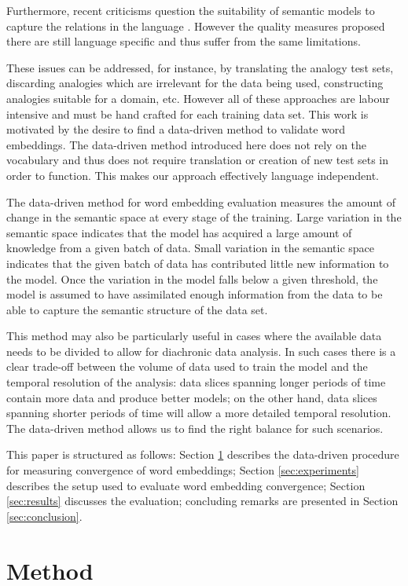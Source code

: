 \documentclass{article} %
\begin{document}
Furthermore, recent criticisms question the suitability of semantic models to capture the relations in the language \cite{Hellrich_COLING2016}. However the quality measures proposed there are still language specific and thus suffer from the same limitations.

These issues can be addressed, for instance, by translating the analogy test sets, discarding analogies which are irrelevant for the data being used, constructing analogies suitable for a domain, etc. However all of these approaches are labour intensive and must be hand crafted for each training data set. This work is motivated by the desire to find a data-driven method to validate word embeddings. The data-driven method introduced here does not rely on the vocabulary and thus does not require translation or creation of new test sets in order to function. This makes our approach effectively language independent.

The data-driven method for word embedding evaluation measures the amount of change in the semantic space at every stage of the training. Large variation in the semantic space indicates that the model has acquired a large amount of knowledge from a given batch of data. Small variation in the semantic space indicates that the given batch of data has contributed little new information to the model. Once the variation in the model falls below a given threshold, the model is assumed to have assimilated enough information from the data to be able to capture the semantic structure of the data set.

This method may also be particularly useful in cases where the available data needs to be divided to allow for diachronic data analysis. In such cases there is a clear trade-off between the volume of data used to train the model and the temporal resolution of the analysis: data slices spanning longer periods of time contain more data and produce better models; on the other hand, data slices spanning shorter periods of time will allow a more detailed temporal resolution. The data-driven method allows us to find the right balance for such scenarios.

This paper is structured as follows: Section \ref{sec:method} describes the data-driven procedure for measuring convergence of word embeddings; Section \ref{sec:experiments} describes the setup used to evaluate word embedding convergence; Section \ref{sec:results} discusses the evaluation; concluding remarks are presented in Section \ref{sec:conclusion}.

\section{Method}
\label{sec:method}
\end{document}
